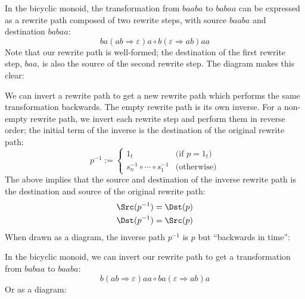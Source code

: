 \documentclass[../generics]{subfiles}
\begin{document}
\begin{example}
In the bicyclic monoid, the transformation from $baaba$ to $babaa$ can be expressed as a rewrite path composed of two rewrite steps, with source $baaba$ and destination $babaa$:
\[ba(ab\Rightarrow\varepsilon)a\circ b(\varepsilon\Rightarrow ab)aa\]
Note that our rewrite path is well-formed; the destination of the first rewrite step, $baa$, is also the source of the second rewrite step. The diagram makes this clear:
\begin{quote}
\end{quote}
\end{example}
\begin{definition}
We can invert a rewrite path to get a new rewrite path which performs the same transformation backwards. The empty rewrite path is its own inverse. For a non-empty rewrite path, we invert each rewrite step and perform them in reverse order; the initial term of the inverse is the destination of the original rewrite path:
\[p^{-1}:=\begin{cases}
1_t&\text{(if $p=1_t$)}\\
s_n^{-1}\circ\cdots\circ s_1^{-1}&\text{(otherwise)}
\end{cases}
\]
The above implies that the source and destination of the inverse rewrite path is the destination and source of the original rewrite path:
\begin{gather*}
\Src(p^{-1})=\Dst(p)\\
\Dst(p^{-1})=\Src(p)
\end{gather*}
When drawn as a diagram, the inverse path $p^{-1}$ is $p$ but ``backwards in time'':
\begin{quote}
\end{quote}
\end{definition}
\begin{example}
In the bicyclic monoid, we can invert our rewrite path to get a transformation from $babaa$ to $baaba$:
\[b(ab\Rightarrow\varepsilon)aa\circ ba(\varepsilon\Rightarrow ab)a\]
Or as a diagram:
\begin{quote}
\end{quote}
\end{example}
\end{document}
